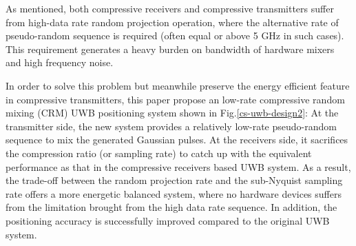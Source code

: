 As mentioned, both compressive receivers and compressive transmitters suffer from high-data rate random projection operation, where the alternative rate of pseudo-random sequence is required (often equal or above 5 GHz in such cases). This requirement generates a heavy burden on bandwidth of hardware mixers and high frequency noise. 

In order to solve this problem but meanwhile preserve the energy efficient feature in compressive transmitters, this paper propose an low-rate compressive random mixing (CRM) UWB positioning system shown in Fig.\ref{cs-uwb-design2}: At the transmitter side, the new system provides a relatively low-rate pseudo-random sequence to mix the generated Gaussian pulses. At the receivers side, it sacrifices the compression ratio (or sampling rate) to catch up with the equivalent performance as that in the compressive receivers based UWB system. As a result, the trade-off between the random projection rate and the sub-Nyquist sampling rate offers a more energetic balanced system, where no hardware devices suffers from the limitation brought from the high data rate sequence. In addition, the positioning accuracy is successfully improved compared to the original UWB system. 

